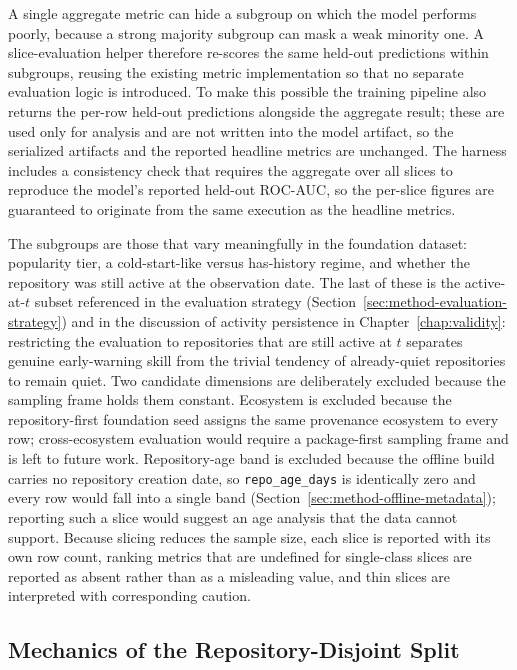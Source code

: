 A single aggregate metric can hide a subgroup on which the model performs poorly, because a strong majority subgroup can mask a weak minority one. A slice-evaluation helper therefore re-scores the same held-out predictions within subgroups, reusing the existing metric implementation so that no separate evaluation logic is introduced. To make this possible the training pipeline also returns the per-row held-out predictions alongside the aggregate result; these are used only for analysis and are not written into the model artifact, so the serialized artifacts and the reported headline metrics are unchanged. The harness includes a consistency check that requires the aggregate over all slices to reproduce the model's reported held-out ROC-AUC, so the per-slice figures are guaranteed to originate from the same execution as the headline metrics.

The subgroups are those that vary meaningfully in the foundation dataset: popularity tier, a cold-start-like versus has-history regime, and whether the repository was still active at the observation date. The last of these is the active-at-\(t\) subset referenced in the evaluation strategy (Section~\ref{sec:method-evaluation-strategy}) and in the discussion of activity persistence in Chapter~\ref{chap:validity}: restricting the evaluation to repositories that are still active at \(t\) separates genuine early-warning skill from the trivial tendency of already-quiet repositories to remain quiet. Two candidate dimensions are deliberately excluded because the sampling frame holds them constant. Ecosystem is excluded because the repository-first foundation seed assigns the same provenance ecosystem to every row; cross-ecosystem evaluation would require a package-first sampling frame and is left to future work. Repository-age band is excluded because the offline build carries no repository creation date, so \texttt{repo\_age\_days} is identically zero and every row would fall into a single band (Section~\ref{sec:method-offline-metadata}); reporting such a slice would suggest an age analysis that the data cannot support. Because slicing reduces the sample size, each slice is reported with its own row count, ranking metrics that are undefined for single-class slices are reported as absent rather than as a misleading value, and thin slices are interpreted with corresponding caution.

\subsection{Mechanics of the Repository-Disjoint Split}
\label{sec:impl-grouped-split}

